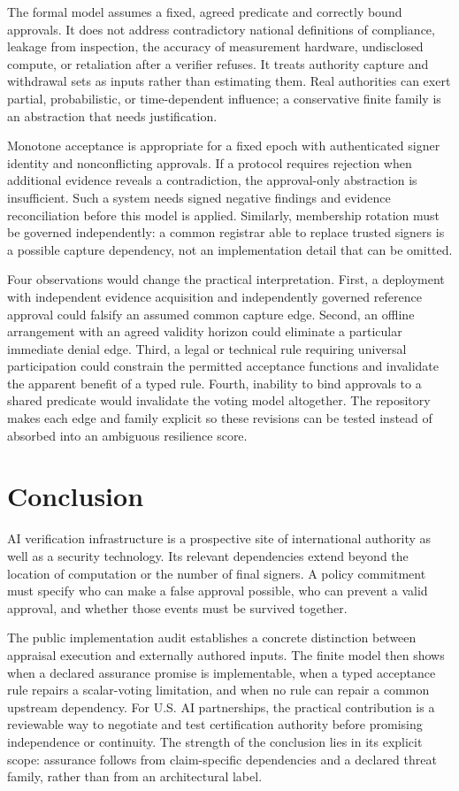 \documentclass[11pt,letterpaper]{article}
\begin{document}
The formal model assumes a fixed, agreed predicate and correctly bound approvals. It does not address contradictory national definitions of compliance, leakage from inspection, the accuracy of measurement hardware, undisclosed compute, or retaliation after a verifier refuses. It treats authority capture and withdrawal sets as inputs rather than estimating them. Real authorities can exert partial, probabilistic, or time-dependent influence; a conservative finite family is an abstraction that needs justification.

Monotone acceptance is appropriate for a fixed epoch with authenticated signer identity and nonconflicting approvals. If a protocol requires rejection when additional evidence reveals a contradiction, the approval-only abstraction is insufficient. Such a system needs signed negative findings and evidence reconciliation before this model is applied. Similarly, membership rotation must be governed independently: a common registrar able to replace trusted signers is a possible capture dependency, not an implementation detail that can be omitted.

Four observations would change the practical interpretation. First, a deployment with independent evidence acquisition and independently governed reference approval could falsify an assumed common capture edge. Second, an offline arrangement with an agreed validity horizon could eliminate a particular immediate denial edge. Third, a legal or technical rule requiring universal participation could constrain the permitted acceptance functions and invalidate the apparent benefit of a typed rule. Fourth, inability to bind approvals to a shared predicate would invalidate the voting model altogether. The repository makes each edge and family explicit so these revisions can be tested instead of absorbed into an ambiguous resilience score.

\section{Conclusion}
AI verification infrastructure is a prospective site of international authority as well as a security technology. Its relevant dependencies extend beyond the location of computation or the number of final signers. A policy commitment must specify who can make a false approval possible, who can prevent a valid approval, and whether those events must be survived together.

The public implementation audit establishes a concrete distinction between appraisal execution and externally authored inputs. The finite model then shows when a declared assurance promise is implementable, when a typed acceptance rule repairs a scalar-voting limitation, and when no rule can repair a common upstream dependency. For U.S. AI partnerships, the practical contribution is a reviewable way to negotiate and test certification authority before promising independence or continuity. The strength of the conclusion lies in its explicit scope: assurance follows from claim-specific dependencies and a declared threat family, rather than from an architectural label.
\end{document}
